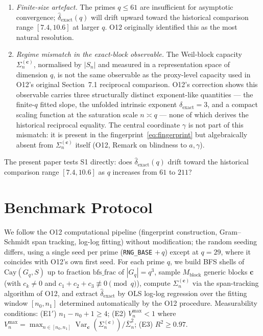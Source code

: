 \documentclass[11pt,a4paper]{article}
\theoremstyle{plain}
\theoremstyle{definition}
\DeclareMathOperator{\Var}{Var}
\newcommand{\Gq}{G_q}
\newcommand{\dhat}{\hat\delta_{\mathrm{exact}}}
\begin{document}
  \begin{enumerate}
    \item[(S1)] \emph{Finite-size artefact.}
    The primes $q \leq 61$ are insufficient for asymptotic convergence;
    $\dhat(q)$ will drift upward toward the historical comparison range $[7.4, 10.6]$ at larger $q$.
    O12 originally identified this as the most natural resolution.
    \item[(S2)] \emph{Regime mismatch in the exact-block observable.}
    The Weil-block capacity $\Sigma_n^{(\mathbf{c})}$, normalised by $|S_n|$
    and measured in a representation space of dimension $q$, is not the same
    observable as the proxy-level capacity used in O12's original
    Section~7.1 reciprocal comparison.
    O12's correction shows this observable carries three structurally distinct
    exponent-like quantities — the finite-$q$ fitted slope, the unfolded intrinsic
    exponent $\delta_{\mathrm{exact}}=3$, and a compact scaling function at the
    saturation scale $n\asymp q$ — none of which derives the historical reciprocal equality.
    The central coordinate $\gamma$ is not part of this mismatch: it is present in
    the fingerprint~\eqref{eq:fingerprint} but algebraically absent from
    $\Sigma_n^{(\mathbf{c})}$ itself (O12, Remark on blindness to $a,\gamma$).
  \end{enumerate}

  The present paper tests S1 directly: does $\dhat(q)$ drift toward the historical comparison range
  $[7.4, 10.6]$ as $q$ increases from $61$ to $211$?

  \section{Benchmark Protocol}
  \label{sec:protocol}

  We follow the O12 computational pipeline (fingerprint construction,
  Gram--Schmidt span tracking, log-log fitting) without modification; the
  random seeding differs, using a single seed per prime (\texttt{RNG\_BASE}
  $+\,q$) except at $q=29$, where it coincides with O12's own first seed.
  For each prime $q$, we build BFS shells of $\mathrm{Cay}(\Gq, S)$ up to
  fraction $\mathrm{bfs\_frac}$ of $|\Gq| = q^3$, sample $M_{\mathrm{block}}$
  generic blocks $\mathbf{c}$ (with $c_k \neq 0$ and
  $c_1 + c_2 + c_3 \not\equiv 0 \pmod{q}$), compute $\Sigma_n^{(\mathbf{c})}$
  via the span-tracking algorithm of O12, and extract $\dhat$ by OLS log-log
  regression over the fitting window $[n_0, n_1]$ determined automatically by
  the O12 procedure.
  Measurability conditions:
  (E1$'$) $n_1 - n_0 + 1 \geq 4$;
  (E2) $V_n^{\max} < 1$ where $V_n^{\max} = \max_{n \in [n_0,n_1]}
  \Var_{\mathbf{c}}(\Sigma_n^{(\mathbf{c})})/\bar\Sigma_n^2$;
  (E3) $R^2 \geq 0.97$.
\end{document}
